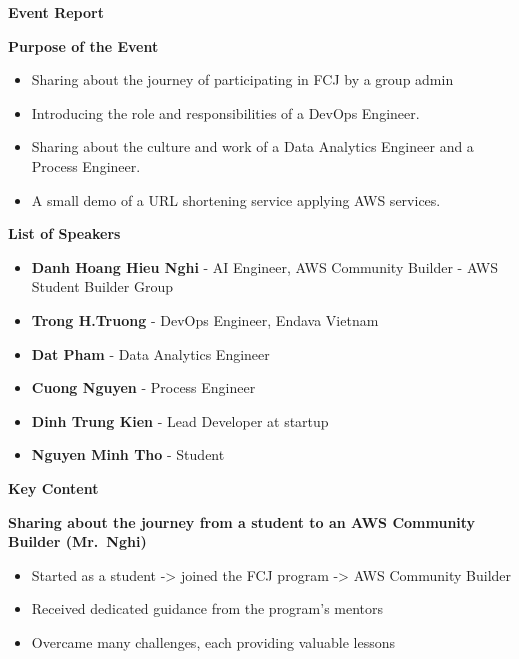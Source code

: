 \vspace{0.5em}\noindent\textbf{Event Report}\par

\vspace{0.5em}\noindent\textbf{Purpose of the Event}\par

\begin{itemize}
\tightlist
\item
  Sharing about the journey of participating in FCJ by a group admin
\item
  Introducing the role and responsibilities of a DevOps Engineer.
\item
  Sharing about the culture and work of a Data Analytics Engineer and a
  Process Engineer.
\item
  A small demo of a URL shortening service applying AWS services.
\end{itemize}

\vspace{0.5em}\noindent\textbf{List of Speakers}\par

\begin{itemize}
\tightlist
\item
  \textbf{Danh Hoang Hieu Nghi} - AI Engineer, AWS Community Builder -
  AWS Student Builder Group
\item
  \textbf{Trong H.Truong} - DevOps Engineer, Endava Vietnam
\item
  \textbf{Dat Pham} - Data Analytics Engineer
\item
  \textbf{Cuong Nguyen} - Process Engineer
\item
  \textbf{Dinh Trung Kien} - Lead Developer at startup
\item
  \textbf{Nguyen Minh Tho} - Student
\end{itemize}

\vspace{0.5em}\noindent\textbf{Key Content}\par

\vspace{0.5em}\noindent\textbf{Sharing about the journey from a student to an AWS Community
Builder
(Mr.~Nghi)}\par

\begin{itemize}
\tightlist
\item
  Started as a student -\textgreater{} joined the FCJ program
  -\textgreater{} AWS Community Builder
\item
  Received dedicated guidance from the program's mentors
\item
  Overcame many challenges, each providing valuable lessons
\end{itemize}

